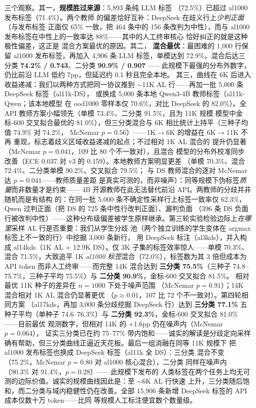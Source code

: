 \documentclass[11pt,a4paper]{article}
\begin{document}
三个观察。其一，\textbf{规模胜过来源}：5{,}893 条纯 LLM 标签
（72.5\%）已超过 al1000 发布标签（71.4\%）。两个教师
的偏差恰好互补：DeepSeek 在歧义行上\emph{少判正面}（与发布标签
正面仅 65\% 一致，把 464 条中的 156 条改判为中性），而与
al1000 发布标签在中性上的一致率达 88\%——其中的人工终审核心
恰好纠正的就是这种极性偏差，这正是
混合方案最优的原因。其二，
\textbf{混合最优}：最困难的 1{,}000 行保留 al1000 发布标签，再加入
4{,}906 条 LLM 标签，单模达到 72.9\%，混合后达三分类
\textbf{74.2\% / 0.743}、二分类 \textbf{90.9\% / 0.907}
——此规模下最强的分布外数字，仍比前沿 LLM 低约 7pp，但延迟约
0.1 秒且完全本地。
其三，曲线在 6K 后进入收益递减：我们以两种方式把同一协议推到
$\sim$11K AL 行——再加一批 5{,}000 条 DeepSeek 标签（al11k-DS），
或换成 5{,}000 条本地 Qwen3-4B 教师标签（al11k-Qwen；该本地模型
在 ood1000 零样本仅 70.6\%，对比 DeepSeek 的 82.0\%）。全 API
教师方案小幅领先（单模 73.4\%、二分类 91.5\%，且为 11K 规模
模型中金标-600 交叉拟合最优的 81.0\%），但三分类混合与 6K
相比统计上持平（三种子均值 74.9\% 对 74.2\%，
McNemar $p = 0.56$）——1K$\to$6K 的增益在 6K$\to$11K 不再
重现，标志着歧义区域收益递减的起点；不过相对 1K AL 混合的
提升仍显著（McNemar $p = 0.041$，109 比 80 个不一致对），且混合
模型的分布外校准同步改善（ECE 0.037 对 v3 的 0.159）。本地教师方案明显更差
（单模 70.3\%、混合 72.4\%、二分类单模 90.2\%、交叉拟合 79.5\%；
与 DS 教师混合的逐对 McNemar 达 $p = 0.041$——教师质量差距
是真实可测的，而非噪声）：同等规模下伪标签\emph{质量}而非数量才是约束——
4B 开源教师在此无法替代前沿 API。两教师的分歧并非随机而是有结构
的：在同一批 5{,}000 条不确定性采样行上标签一致率仅 62.3\%，
Qwen 过判正面（把 DS 的 725 条中性行改判正面）、漏判负面
（396 条 DS 负面行被改判中性）——这种分布级偏差被学生原样继承。第三轮实验检验边际上\emph{在哪里}采样 AL 行是否重要：我们从学生分歧
池（两个独立训练的学生变体在 argmax 标签上不一致的行）中挖掘
3{,}000 条新行，
用 DeepSeek 标注（al3kds），并入构成 al14kds（1K AL +
12.9K DS）。仅 3K 子集的标签效率惊人——单模 70.3\%、混合
71.5\%，大致追平 1K \emph{al1000 标签}混合（72.0\%），标签数为其
3 倍但成本为 API token 而非人工终审——而完整 14K 混合达到
\textbf{三分类 75.5\%}（三种子 74.8--75.7\%，三种子平均
75.5\%）与 \textbf{二分类 90.9\%}，金标-600 交叉拟合 81.5\%。
相对最优 11K 种子的差异在 $n{=}1000$ 下处于噪声范围
（McNemar $p = 0.91$）；14K 混合相对 1K AL 混合仍显著更优
（$p \approx 0.01$，107 比 72 个不一致对）。第四轮相同方案
（al17kds，再加 3{,}000 条分歧挖掘 DeepSeek 行）达到
\textbf{三分类 77.1\%} 五种子平均（单种子 74.6--76.3\%）与
\textbf{二分类 92.3\%}，金标-600 交叉拟合 81.0\%——目前最优
观测数字，但相对 14K 的 +1.6pp 仍在噪声内（McNemar $p = 0.064$），
证实三分类已在约 75--77\% 带内饱和——诚实的解读是分歧定向采样
确有帮助，但三分类曲线正逼近天花板。最后一组消融在同等 11K 规模下
把 al1000 发布标签也换成 DeepSeek 标签（al11k 全 DS）：三分类
混合不变（75.2\%，McNemar $p = 0.80$ 对 al1000 核心混合），二分类
同样在噪声内（90.3\% 对 91.4\%，$p = 0.28$）——此规模下发布的
人类标签在两个任务上均无可测的边际价值。诚实的规模曲线因此是：至 $\sim$6K AL 行快速
上升，三分类随后饱和，而二分类与域内稳健性仍在改善。全部
15{,}906 条新增 DeepSeek 标签的 API 成本仅数十万 token——比同
等规模人工标注便宜数个数量级。
\end{document}
